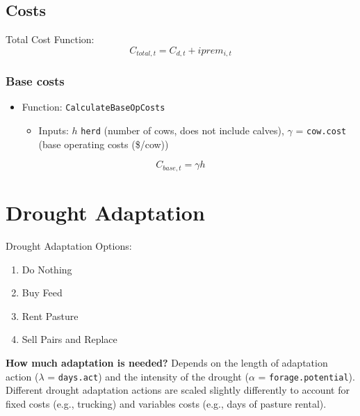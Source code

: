 \documentclass[11pt]{article}
\begin{document}
\subsection{Costs}
Total Cost Function:
\begin{equation}
C_{total,t} = C_{d, t} + iprem_{i,t} 
\end{equation}


\subsubsection{Base costs}
\begin{itemize}
\item Function: \verb!CalculateBaseOpCosts!
	\begin{itemize}
	\item Inputs: \(h\) \verb!herd! (number of cows, does not include calves), \(\gamma\) = \verb!cow.cost! (base operating costs (\$/cow))
	\end{itemize}
\end{itemize}

\begin{equation} \label{basecost}
C_{base,t} = \gamma h 
\end{equation}


\section{Drought Adaptation}
Drought Adaptation Options:
\begin{enumerate}
\item Do Nothing
\item Buy Feed
\item Rent Pasture
\item Sell Pairs and Replace
\end{enumerate}

\textbf{How much adaptation is needed?} 
Depends on the length of adaptation action ($\lambda$ = \verb!days.act!) and the intensity of the drought ($\alpha$ = \verb!forage.potential!). Different drought adaptation actions are scaled slightly differently to account for fixed costs (e.g., trucking) and variables costs (e.g., days of pasture rental). 
\end{document}
